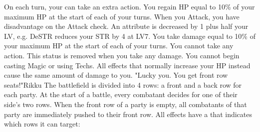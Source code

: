  On each turn, your can take an extra action. \ofrow
{} You regain HP equal to 10\% of your maximum HP at the start of each of your turns. \ofrow
{} When you Attack, you have disadvantage on the Attack check. \ofrow
{} An attribute is decreased by 1 plus half your LV, e.g. DeSTR reduces your STR by 4 at LV7.\ofrow
{} You take damage equal to 10\% of your maximum HP at the start of each of your turns.\ofrow
{} You cannot take any action. This status is removed when you take any damage.\ofrow
{} You cannot begin casting Magic or using Techs.\ofrow
{} All effects that normally increase your HP instead cause the same amount of damage to you.
%
\clearpage
%
{"Lucky you. You get front row seats!"}{Rikku}{
The battlefield is divided into 4 rows: a front and a back row for each party.
At the start of a battle, every combatant decides for one of their side's two rows.
When the front row of a party is empty, all combatants of that party are immediately pushed to their front row.
All effects have a  that indicates which rows it can target:\ofrow
{}
}
%
\vfill
%
